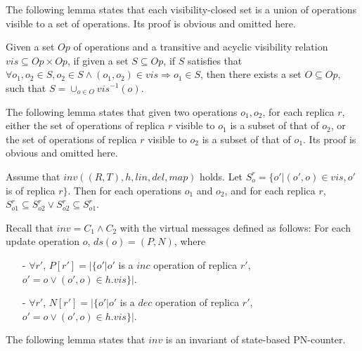 {The following lemma states that each visibility-closed set is a union of operations visible to a set of operations. Its proof is obvious and omitted here.

\begin{lemma}
\label{lemma:a transitive-closed set is a union of visibility of several sets}
Given a set $\mathit{Op}$ of operations and a transitive and acyclic visibility relation $\mathit{vis} \subseteq \mathit{Op} \times \mathit{Op}$, if given a set $S \subseteq \mathit{Op}$, if $S$ satisfies that $\forall o_1,o_2 \in S, o_2 \in S \wedge (o_1,o_2) \in \mathit{vis} \Rightarrow o_1 \in S$, then there exists a set $O \subseteq \mathit{Op}$, such that $S = \cup_{o \in O} \mathit{vis}^{-1}(o)$.
\end{lemma}

The following lemma states that given two operations $o_1,o_2$, for each replica $r$, either the set of operations of replica $r$ visible to $o_1$ is a subset of that of $o_2$, or the set of operations of replica $r$ visible to $o_2$ is a subset of that of $o_1$. Its proof is obvious and omitted here.

\begin{lemma}
\label{lemma:the view of a replica of one operation is contained in another operaiton, or vice versa}
Assume that $\mathit{inv}((R,T),h,\mathit{lin},\mathit{del},\mathit{map})$ holds. Let $S_o^r = \{ o' \vert (o',o) \in \mathit{vis}, o'$ is of replica $r \}$. Then for each operations $o_1$ and $o_2$, and for each replica $r$, $S_{\mathit{o1}}^r \subseteq S_{\mathit{o2}}^r \vee S_{\mathit{o2}}^r \subseteq S_{\mathit{o1}}^r$.
\end{lemma}


Recall that $\mathit{inv} = C_1 \wedge C_2$ with the virtual messages defined as follows: For each update operation $o$, $\mathit{ds}(o) = (P,N)$, where

\begin{itemize}
\setlength{\itemsep}{0.5pt}
\item[-] $\forall r'$, $P[r'] = \vert \{ o' \vert o'$ is a $\mathit{inc}$ operation of replica $r'$, $o' = o \vee (o',o) \in h.\mathit{vis} \} \vert$.

\item[-] $\forall r'$, $N[r'] = \vert \{ o' \vert o'$ is a $\mathit{dec}$ operation of replica $r'$, $o' = o \vee (o',o) \in h.\mathit{vis} \} \vert$.
\end{itemize}

The following lemma states that $\mathit{inv}$ is an invariant of state-based PN-counter.

}
